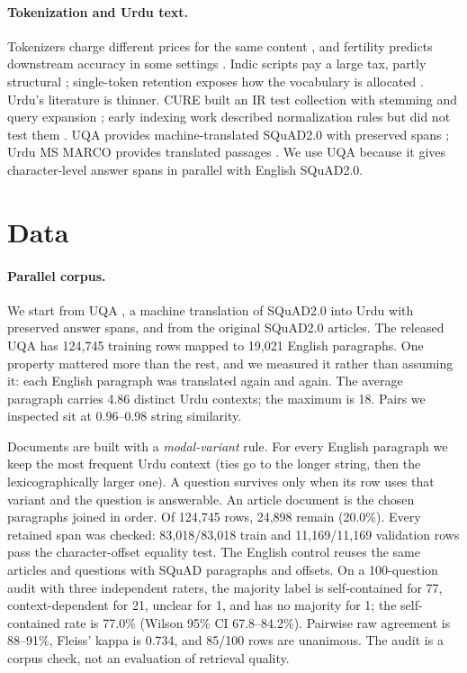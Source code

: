 \documentclass[11pt]{article}
\begin{document}
\paragraph{Tokenization and Urdu text.}
Tokenizers charge different prices for the same content \citep{petrov2023language,ahia2023do}, and
fertility predicts downstream accuracy in some settings \citep{lundin2025the}. Indic scripts pay a
large tax, partly structural \citep{srivastava2026the,regmi2026vowel}; single-token retention
exposes how the vocabulary is allocated \citep{nayeem2025beyond}. Urdu's literature is thinner.
CURE built an IR test collection with stemming and query expansion \citep{iqbal2020cure}; early
indexing work described normalization rules but did not test them \citep{qureshi2021an}. UQA
provides machine-translated SQuAD2.0 with preserved spans \citep{arif2024uqa}; Urdu MS MARCO
provides translated passages \citep{butt2024enabling}. We use UQA because it gives character-level
answer spans in parallel with English SQuAD2.0.

\section{Data}

\paragraph{Parallel corpus.}
We start from UQA \citep{arif2024uqa}, a machine translation of SQuAD2.0 into Urdu with preserved
answer spans, and from the original SQuAD2.0 articles. The released UQA has 124{,}745 training rows
mapped to 19{,}021 English paragraphs. One property mattered more than the rest, and we measured it
rather than assuming it: each English paragraph was translated again and again. The average
paragraph carries 4.86 distinct Urdu contexts; the maximum is 18. Pairs we inspected sit at
0.96--0.98 string similarity.

Documents are built with a \emph{modal-variant} rule. For every English paragraph we keep the most
frequent Urdu context (ties go to the longer string, then the lexicographically larger one). A
question survives only when its row uses that variant and the question is answerable. An article
document is the chosen paragraphs joined in order. Of 124{,}745 rows, 24{,}898 remain (20.0\%).
Every retained span was checked: 83{,}018/83{,}018 train and 11{,}169/11{,}169 validation rows pass
the character-offset equality test. The English control reuses the same articles and questions with
SQuAD paragraphs and offsets. On a 100-question audit with three independent raters, the majority
label is self-contained for 77, context-dependent for 21, unclear for 1, and has no majority for 1;
the self-contained rate is 77.0\% (Wilson 95\% CI 67.8--84.2\%). Pairwise raw agreement is 88--91\%,
Fleiss' kappa is 0.734, and 85/100 rows are unanimous. The audit is a corpus check, not an
evaluation of retrieval quality.
\end{document}
